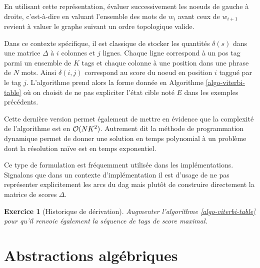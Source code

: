 \documentclass[11pt,openany]{book}
\newtheorem{exo}{Exercice}[chapter]
\newcommand{\ac}[1]{{\sc #1}} %
\begin{document}
En utilisant cette représentation, évaluer successivement les noeuds
de gauche à droite,  c'est-à-dire en valuant l'ensemble des mots de
$w_i$  avant ceux de $w_{i+1}$ revient à valuer le graphe suivant un
ordre topologique valide.

Dans ce contexte spécifique, il est classique de stocker les quantités
$\delta(s)$ dans une matrice $\Delta$ à $i$ colonnes et $j$ lignes.
Chaque ligne correspond à un pos tag parmi un ensemble de $K$ tags et chaque colonne à une position
dans une phrase de $N$ mots. Ainsi $\delta(i,j)$ correspond au score du noeud en
position $i$ taggué par le tag $j$. L'algorithme prend alors la forme
donnée en Algorithme \ref{algo-viterbi-table} où on choisit de 
ne pas expliciter l'état cible noté $E$ dans les exemples précédents.

Cette dernière version permet également de mettre en évidence que la complexité
de l'algorithme est en ${\cal O}(NK^2)$.  
Autrement dit la méthode de programmation dynamique permet de
donner une solution en temps polynomial à un problème dont la
résolution naïve est en temps exponentiel.

\begin{algorithm}[htbp]
\caption{\label{algo-viterbi-table}Algorithme de Viterbi (version tabulaire)}
\end{algorithm}

Ce type de formulation est fréquemment utilisée dans les
implémentations. Signalons que dans un contexte d'implémentation il est d'usage de
ne pas représenter explicitement les arcs du \ac{dag} mais plutôt de
construire directement la matrice de scores $\Delta$.

\begin{exo}[Historique de dérivation]
Augmenter l'algorithme \ref{algo-viterbi-table} pour qu'il renvoie
également la séquence de tags de score maximal.
\end{exo}

\section{Abstractions algébriques}
\label{sec-semi-ring}
\end{document}
